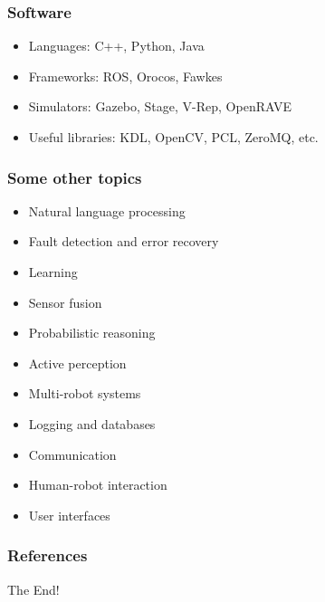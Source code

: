 \documentclass{beamer}
\begin{document}
\begin{frame}
\frametitle{Software}
\begin{itemize}
    \item <1->Languages: C++, Python, Java
    \item <2->Frameworks: ROS, Orocos, Fawkes
    \item <3->Simulators: Gazebo, Stage, V-Rep, OpenRAVE
    \item <4->Useful libraries: KDL, OpenCV, PCL, ZeroMQ, etc.
\end{itemize}
\end{frame}


\begin{frame}
\frametitle{Some other topics}
\begin{itemize}
    \item <1->Natural language processing
    \item <2->Fault detection and error recovery
    \item <3->Learning
    \item <4->Sensor fusion
    \item <5->Probabilistic reasoning
    \item <6->Active perception
    \item <7->Multi-robot systems
    \item <8->Logging and databases
    \item <9->Communication
    \item <10->Human-robot interaction
    \item <11->User interfaces
\end{itemize}
\end{frame}

\appendix
\begin{frame}[allowframebreaks]
        \frametitle{References}
        
        
\end{frame}

\begin{frame}[standout]
     The End!
\end{frame}



\end{document}
